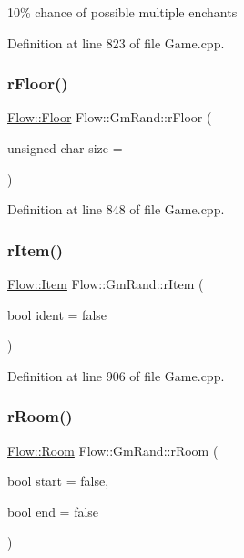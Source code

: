 10\% chance of possible multiple enchants 

Definition at line 823 of file Game.\+cpp.

\hypertarget{class_flow_1_1_gm_rand_a9ca568e62a941c10e42bedb3e334ed52}{}\label{class_flow_1_1_gm_rand_a9ca568e62a941c10e42bedb3e334ed52} 
\subsubsection{\texorpdfstring{r\+Floor()}{rFloor()}}
{\footnotesize\ttfamily \hyperlink{class_flow_1_1_floor}{Flow\+::\+Floor} Flow\+::\+Gm\+Rand\+::r\+Floor (\begin{DoxyParamCaption}\item[{unsigned char}]{size = {} }\end{DoxyParamCaption})}



Definition at line 848 of file Game.\+cpp.

\hypertarget{class_flow_1_1_gm_rand_afd6a5837d6c9ffa4b29e8f1fd829dfc7}{}\label{class_flow_1_1_gm_rand_afd6a5837d6c9ffa4b29e8f1fd829dfc7} 
\subsubsection{\texorpdfstring{r\+Item()}{rItem()}}
{\footnotesize\ttfamily \hyperlink{class_flow_1_1_item}{Flow\+::\+Item} Flow\+::\+Gm\+Rand\+::r\+Item (\begin{DoxyParamCaption}\item[{bool}]{ident = {\ttfamily false} }\end{DoxyParamCaption})}



Definition at line 906 of file Game.\+cpp.

\hypertarget{class_flow_1_1_gm_rand_a8a978d8967082e7e519996204c29eb9d}{}\label{class_flow_1_1_gm_rand_a8a978d8967082e7e519996204c29eb9d} 
\subsubsection{\texorpdfstring{r\+Room()}{rRoom()}}
{\footnotesize\ttfamily \hyperlink{class_flow_1_1_room}{Flow\+::\+Room} Flow\+::\+Gm\+Rand\+::r\+Room (\begin{DoxyParamCaption}\item[{bool}]{start = {\ttfamily false},  }\item[{bool}]{end = {\ttfamily false} }\end{DoxyParamCaption})}



